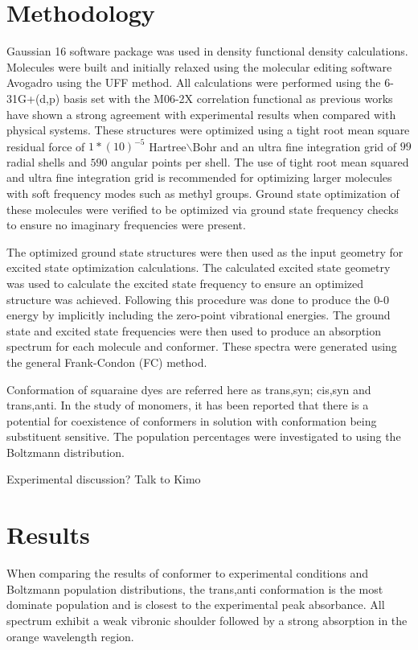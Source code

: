 \documentclass[journal=jacsat,manuscript=article]{achemso}
\begin{document}
\section{Methodology}
Gaussian 16 software package\cite{M.J.FrischG.W.Trucks2016Gaussian09}⁠ was used in density functional density calculations. Molecules were built and initially relaxed using the molecular editing software Avogadro\cite{Hanwell2012Avogadro:Platform}⁠ using the UFF\cite{Rappe1992UFFSimulations}⁠ method. All calculations were performed using the 6-31G+(d,p) basis set with the M06-2X\cite{Zhao2008TheFunction}⁠ correlation functional as previous works have shown a strong agreement with experimental results when compared with physical systems\citep{Jacquemin2016Excited-StateCC2,Jacquemin20150-0Compounds}. These structures were optimized using a tight root mean square residual force of $1*(10)^{-5}$  Hartree$\backslash$Bohr and an ultra fine integration grid of $99$ radial shells and $590$ angular points per shell. The use of tight root mean squared and ultra fine integration grid is recommended for optimizing larger molecules with soft frequency modes such as methyl groups\cite{AzaisTestingSuper-Resolution}. Ground state optimization of these molecules were verified to be optimized via ground state frequency checks to ensure no imaginary frequencies were present.

The optimized ground state structures were then used as the input geometry for excited state optimization calculations. The calculated excited state geometry was used to calculate the excited state frequency to ensure an optimized structure was achieved. Following this procedure was done to produce the 0-0 energy by implicitly including the zero-point vibrational energies\cite{Adamo2013TheTheory}. The ground state and excited state frequencies were then used to produce an absorption spectrum for each molecule and conformer. These spectra were generated using the general Frank-Condon (FC) method. 

Conformation of squaraine dyes are referred here as trans,syn; cis,syn and trans,anti. In the study of monomers, it has been reported that there is a potential for coexistence of conformers in solution with conformation being substituent sensitive\citep{Kolosova2019MolecularSquaraines,Rohr2018ExcitonDimers}⁠. The population percentages were investigated to using the Boltzmann distribution.

Experimental discussion? Talk to Kimo

\section{Results}
When comparing the results of conformer to experimental conditions and Boltzmann population distributions, the trans,anti conformation is the most dominate population and is closest to the experimental peak absorbance. All spectrum exhibit a weak vibronic shoulder followed by a strong absorption in the orange wavelength region.
\end{document}
